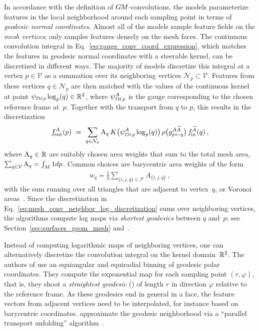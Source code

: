 In accordance with the definition of $G\mkern-1.4muM$-convolutions, the models parameterize features in the local neighborhood around each sampling point in terms of \emph{geodesic normal coordinates}.
Almost all of the models sample feature fields on the \emph{mesh vertices}; only \citet{huang2019texturenet} samples features densely on the mesh faces.
The continuous convolution integral in Eq.~\eqref{eq:gauge_conv_coord_expression}, which matches the features in geodesic normal coordinates with a steerable kernel, can be discretized in different ways.
The majority of models discretize this integral at a vertex $p\in\mathcal{V}$ as a summation over its neighboring vertices $\mathcal{N}_p \subset \mathcal{V}$.
Features from these vertices $q\in\mathcal{N}_p$ are then matched with the values of the continuous kernel at point $\psiTMp \log_p(q) \in \R^2$, where $\psiTMp^A$ is the gauge corresponding to the chosen reference frame at~$p$.
Together with the transport from $q$ to $p$, this results in the discretization
\begin{align}\label{eq:mesh_conv_neighbor_log_discretization}
    \fout^A(p)\ =\ \sum_{q\in\mathcal{N}_p} \textup{A}_q\, K\big(\psiTMp^A \log_p(q)\big)\, \rho\big( g^{A\widetilde{A}}_{p\leftarrow q} \big)\, \fin^{\widetilde{A}}(q) \,,
\end{align}
where $\textup{A}_q \in \mathbb{R}$ are suitably chosen area weights that sum to the total mesh area, ${\sum_{q\in\mathcal{V}} \textup{A}_q = \int_M 1 dp}$.
Common choices are barycentric area weights of the form
\begin{align}\label{eq:triangle_area_weights}
    w_q = \frac{1}{3} \sum_{\{i,j,q\}\in\mathcal{F}} A_{\{i,j,q\}} \,,
\end{align}
with the sum running over all triangles that are adjacent to vertex~$q$, or Voronoi areas~\cite{vouga2014lectures}.
Since the discretization in Eq.~\eqref{eq:mesh_conv_neighbor_log_discretization} sums over neighboring vertices, the algorithms compute log maps via \emph{shortest geodesics} between $q$ and~$p$; see Section~\ref{sec:surfaces_geom_mesh} and~\cite{polthier1998straightest}.

Instead of computing logarithmic maps of neighboring vertices, one can alternatively discretize the convolution integral on the kernel domain~$\mathbb{R}^2$.
The authors of \cite{masci2015geodesic} use an equiangular and equiradial binning of geodesic polar coordinates.
They compute the exponential map for each sampling point $(r,\varphi)$, that is, they shoot a \emph{straightest geodesic} (\cite{polthier1998straightest}) of length $r$ in direction $\varphi$ relative to the reference frame.
As these geodesics end in general in a face, the feature vectors from adjacent vertices need to be interpolated, 
for instance based on barycentric coordinates.
\citet{Yang2020parallelFrameCNN} approximate the geodesic neighborhood via a ``parallel transport unfolding'' algorithm~\cite{budninskiy2018parallel}.


